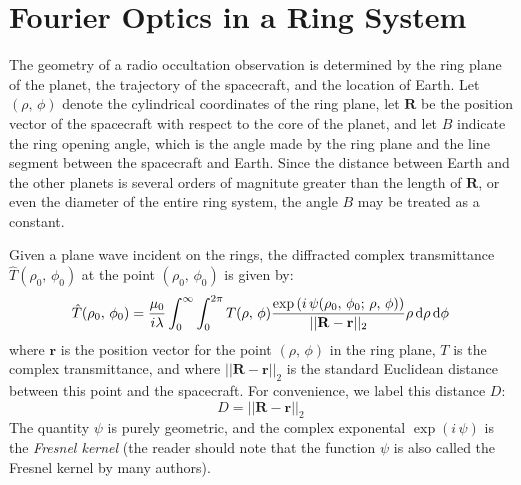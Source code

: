 \documentclass{article}
\begin{document}
    \section{Fourier Optics in a Ring System}
        The geometry of a radio occultation observation is determined by the
        ring plane of the planet, the trajectory of the spacecraft, and the
        location of Earth. Let $(\rho,\,\phi)$ denote the cylindrical
        coordinates of the ring plane, let $\mathbf{R}$ be the position
        vector of the spacecraft with respect to the core of the planet, and
        let $B$ indicate the ring opening angle, which is the angle made
        by the ring plane and the line segment between the spacecraft and
        Earth. Since the distance between Earth and the other planets is
        several orders of magnitute greater than the length of $\mathbf{R}$,
        or even the diameter of the entire ring system, the angle $B$ may be
        treated as a constant.
        \par\hfill\par
        Given a plane wave incident on the rings, the diffracted complex
        transmittance $\hat{T}(\rho_{0},\,\phi_{0})$ at the point
        $(\rho_{0},\,\phi_{0})$ is given by:
        \begin{equation}
            \label{eqn:huygens_principal}
            \hat{T}(\rho_{0},\,\phi_{0})
            =\frac{\mu_{0}}{i\lambda}\int_{0}^{\infty}\int_{0}^{2\pi}
                T(\rho,\,\phi)
                \frac{%
                    \exp\left(
                        i\,\psi(\rho_{0},\,\phi_{0};\,\rho,\,\phi)
                    \right)
                }{%
                    ||\mathbf{R}-\mathbf{r}||_{2}
                }
                \rho\,\textrm{d}\rho\,\textrm{d}\phi
        \end{equation}
        where $\mathbf{r}$ is the position vector for the point
        $(\rho,\,\phi)$ in the ring plane, $T$ is the complex transmittance,
        and where $||\mathbf{R}-\mathbf{r}||_{2}$ is the standard
        Euclidean distance between this point and the spacecraft.
        For convenience, we label this distance $D$:
        \begin{equation}
            D=||\mathbf{R}-\mathbf{r}||_{2}
        \end{equation}
        The quantity $\psi$ is purely geometric, and the complex
        exponental $\exp(i\,\psi)$ is the \textit{Fresnel kernel} (the
        reader should note that the function $\psi$ is also called the Fresnel
        kernel by many authors).
\end{document}
